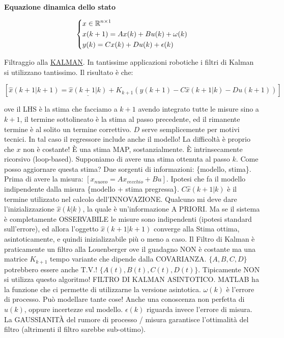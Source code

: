 \begin{defn}{\textbf{Equazione dinamica dello stato}}

\[	
	\left\{
	\begin{aligned}
	&x\in\mathbb{R}^{n\times 1}\\
	&x(k+1) = Ax(k) + Bu(k) + \omega(k)\\
	&y(k) = Cx(k) + Du(k) + \epsilon(k)
	\end{aligned}
	\right.
\]

\end{defn}

Filtraggio alla \underline{KALMAN}. In tantissime applicazioni robotiche i filtri di Kalman si utilizzano tantissimo. Il risultato è che:

\[
	[\hat{x}(k+1|k+1) = \underline{\hat{x}(k+1|k)} + K_{k+1}(y(k+1)-C\hat{x}(k+1|k) - Du(k+1))]
\]

ove il LHS è la stima che facciamo a $k+1$ avendo integrato tutte le misure sino a $k+1$, il termine sottolineato è la stima al passo precedente, ed il rimanente termine è al solito un termine correttivo. $D$ serve semplicemente per motivi tecnici. In tal caso il regressore include anche il modello! La difficoltà è proprio che $x$ non è costante! \`E una stima MAP, sostanzialmente. \`E intrinsecamente ricorsivo (loop-based). Supponiamo di avere una stima ottenuta al passo $k$. Come posso aggiornare questa stima? Due sorgenti di informazioni: \{modello, stima\}. Prima di avere la misura: $[x_{nuovo} = Ax_{vecchio} + Bu]$. Ipotesi che fa il modello indipendente dalla misura \{modello + stima pregressa\}. $C\hat{x}(k+1|k)$ è il termine utilizzato nel calcolo dell'INNOVAZIONE. Qualcuno mi deve dare l'inizializzazione $\hat{x}(k|k)$, la quale è un'informazione A PRIORI. Ma se il sistema è completamente OSSERVABILE le misure sono indipendenti (ipotesi standard sull'errore), ed allora l'oggetto $\hat{x}(k+1|k+1)$ converge alla Stima ottima, asintoticamente, e quindi inizializzabile più o meno a caso. Il Filtro di Kalman è praticamente un filtro alla Louenberger ove il guadagno NON è costante ma una matrice $K_{k+1}$ tempo variante che dipende dalla COVARIANZA. $\{A,B,C,D\}$ potrebbero essere anche T.V.! $\{A(t),B(t),C(t),D(t)\}$. Tipicamente NON si utilizza questo algoritmo! FILTRO DI KALMAN ASINTOTICO. MATLAB ha la funzione che ci permette di utilizzarne la versione asintotica. $\omega(k)$ è l'errore di processo. Può modellare tante cose! Anche una conoscenza non perfetta di $u(k)$, oppure incertezze sul modello. $\epsilon(k)$ riguarda invece l'errore di misura. La GAUSSIANIT\`A del rumore di processo / misura garantisce l'ottimalità del filtro (altrimenti il filtro sarebbe sub-ottimo).

